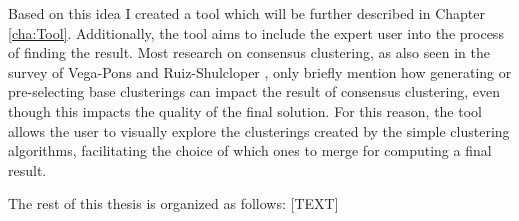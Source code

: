 Based on this idea I created a tool which will be further described in Chapter \ref{cha:Tool}. Additionally, the tool aims to include the expert user into the process of finding the result. Most research on consensus clustering, as also seen in the survey of Vega-Pons and Ruiz-Shulcloper \cite{survey1}, only briefly mention how generating or pre-selecting base clusterings can impact the result of consensus clustering, even though this impacts the quality of the final solution. For this reason, the tool allows the user to visually explore the clusterings created by the simple clustering algorithms, facilitating the choice of which ones to merge for computing a final result.

The rest of this thesis is organized as follows: [TEXT]

